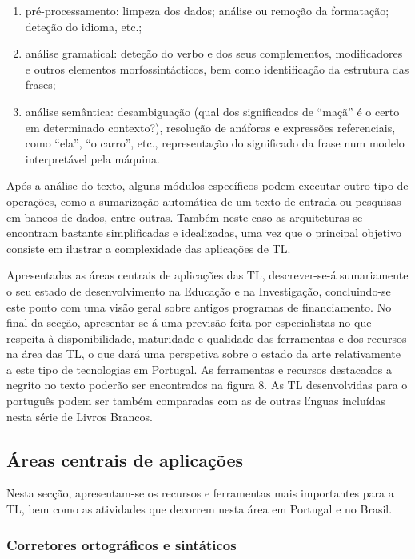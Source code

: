 \documentclass[]{../metanetpaper}
\begin{document}
\begin{multicols}{2}
\begin{enumerate}
 \item pré-processamento: limpeza dos dados; análise ou remoção da formatação; deteção do idioma, etc.; 
      \item análise gramatical: deteção do verbo e dos seus complementos, modificadores e outros elementos morfossintácticos, bem como identificação da estrutura das frases; 
      \item análise semântica: desambiguação (qual dos significados de “maçã” é o certo em determinado contexto?), resolução de anáforas e expressões referenciais, como “ela”, “o carro”, etc., representação do significado da frase num modelo interpretável pela máquina.
\end{enumerate}

 Após a análise do texto, alguns módulos específicos podem executar outro tipo de operações, como a sumarização automática de um texto de entrada ou pesquisas em bancos de dados, entre outras. Também neste caso as arquiteturas se encontram bastante simplificadas e idealizadas, uma vez que o principal objetivo consiste em ilustrar a complexidade das aplicações de TL.

Apresentadas as áreas centrais de aplicações das TL, descrever-se-á sumariamente o seu estado de desenvolvimento na Educação e na Investigação, concluindo-se este ponto com uma visão geral sobre antigos programas de financiamento. No final da secção, apresentar-se-á uma previsão feita por especialistas no que respeita à disponibilidade, maturidade e qualidade das ferramentas e dos recursos na área das TL, o que dará uma perspetiva sobre o estado da arte relativamente a este tipo de tecnologias em Portugal. As ferramentas e recursos destacados a negrito no texto poderão ser encontrados na figura 8. As TL desenvolvidas para o português podem ser também comparadas com as de outras línguas incluídas nesta série de Livros Brancos.

\subsection{Áreas centrais de aplicações} 

Nesta secção, apresentam-se os recursos e ferramentas mais importantes para a TL, bem como as atividades que decorrem nesta área em Portugal e no Brasil.

\subsubsection{Corretores ortográficos e sintáticos}


\end{multicols}
\end{document}
